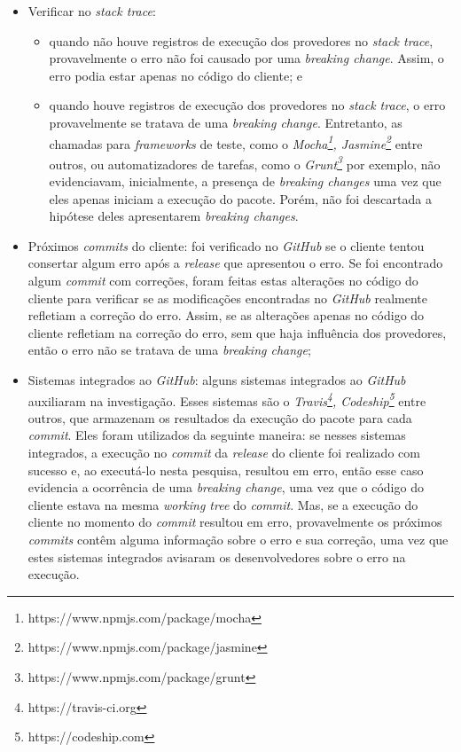 \begin{itemize}
    \item Verificar no \textit{stack trace}:
    \begin{itemize}
        \item quando não houve registros de execução dos provedores no \textit{stack trace}, provavelmente o erro não foi causado por uma \textit{breaking change}. Assim, o erro podia estar apenas no código do cliente; e
        \item quando houve registros de execução dos provedores no \textit{stack trace}, o erro provavelmente se tratava de uma \textit{breaking change}. Entretanto, as chamadas para \textit{frameworks} de teste, como o \textit{Mocha\footnote{https://www.npmjs.com/package/mocha}, Jasmine\footnote{https://www.npmjs.com/package/jasmine}} entre outros, ou automatizadores de tarefas, como o \textit{Grunt\footnote{https://www.npmjs.com/package/grunt}} por exemplo, não evidenciavam, inicialmente, a presença de \textit{breaking changes} uma vez que eles apenas iniciam a execução do pacote. Porém, não foi descartada a hipótese deles apresentarem \textit{breaking changes}.
    \end{itemize}{}

    \item  Próximos \textit{commits} do cliente: foi verificado no \textit{GitHub} se o cliente tentou consertar algum erro após a \textit{release} que apresentou o erro. Se foi encontrado algum \textit{commit} com correções, foram feitas estas alterações no código do cliente para verificar se as modificações encontradas no \textit{GitHub} realmente refletiam a correção do erro. Assim, se as alterações apenas no código do cliente refletiam na correção do erro, sem que haja influência dos provedores, então o erro não se tratava de uma \textit{breaking change};

    \item Sistemas integrados ao \textit{GitHub}: alguns sistemas integrados ao \textit{GitHub} auxiliaram na investigação. Esses sistemas são o \textit{Travis\footnote{https://travis-ci.org}, Codeship\footnote{https://codeship.com}} entre outros, que armazenam os resultados da execução do pacote para cada \textit{commit}. Eles foram utilizados da seguinte maneira: se nesses sistemas integrados, a execução no \textit{commit} da \textit{release} do cliente foi realizado com sucesso e, ao executá-lo nesta pesquisa, resultou em erro, então esse caso evidencia a ocorrência de uma \textit{breaking change}, uma vez que o código do cliente estava na mesma \textit{working tree} do \textit{commit}. Mas, se a execução do cliente no momento do \textit{commit} resultou em erro, provavelmente os próximos \textit{commits} contêm alguma informação sobre o erro e sua correção, uma vez que estes sistemas integrados avisaram os desenvolvedores sobre o erro na execução.
    

\end{itemize}
